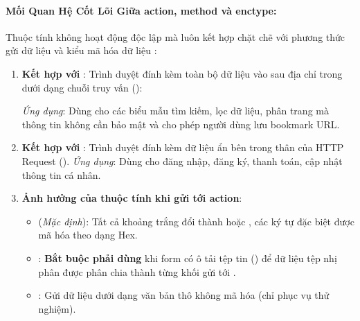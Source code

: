 \paragraph{Mối Quan Hệ Cốt Lõi Giữa action, method và enctype:}

Thuộc tính  không hoạt động độc lập mà luôn kết hợp chặt chẽ với phương thức gửi dữ liệu  và kiểu mã hóa dữ liệu :

\begin{enumerate}[leftmargin=1.5em, itemsep=6pt, parsep=0pt]
    \item \textbf{Kết hợp với }:
    Trình duyệt đính kèm toàn bộ dữ liệu vào sau địa chỉ trong  dưới dạng chuỗi truy vấn ():
    \begin{center}
    \end{center}
    \textit{Ứng dụng}: Dùng cho các biểu mẫu tìm kiếm, lọc dữ liệu, phân trang mà thông tin không cần bảo mật và cho phép người dùng lưu bookmark URL.

    \item \textbf{Kết hợp với }:
    Trình duyệt đính kèm dữ liệu ẩn bên trong thân của HTTP Request ().
    \textit{Ứng dụng}: Dùng cho đăng nhập, đăng ký, thanh toán, cập nhật thông tin cá nhân.

    \item \textbf{Ảnh hưởng của thuộc tính  khi gửi tới action}:
    \begin{itemize}[leftmargin=1.2em, itemsep=2pt]
        \item {} (\textit{Mặc định}): Tất cả khoảng trắng đổi thành \codeinline{+} hoặc , các ký tự đặc biệt được mã hóa theo dạng Hex.
        \item {}: \textbf{Bắt buộc phải dùng} khi form có ô tải tệp tin () để dữ liệu tệp nhị phân được phân chia thành từng khối gửi tới .
        \item {}: Gửi dữ liệu dưới dạng văn bản thô không mã hóa (chỉ phục vụ thử nghiệm).
    \end{itemize}
\end{enumerate}

